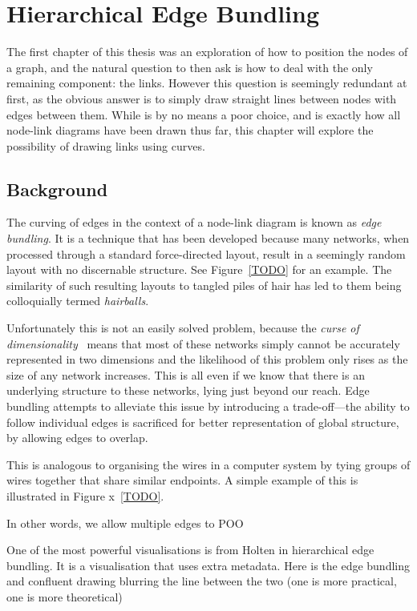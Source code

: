 \chapter{Hierarchical Edge Bundling}
The first chapter of this thesis was an exploration of how to position the nodes of a graph, and the natural question to then ask is how to deal with the only remaining component: the links. However this question is seemingly redundant at first, as the obvious answer is to simply draw straight lines between nodes with edges between them. While is by no means a poor choice, and is exactly how all node-link diagrams have been drawn thus far, this chapter will explore the possibility of drawing links using curves.

\section{Background}
The curving of edges in the context of a node-link diagram is known as \textit{edge bundling}. It is a technique that has been developed because many networks, when processed through a standard force-directed layout, result in a seemingly random layout with no discernable structure. See Figure~\ref{TODO} for an example. The similarity of such resulting layouts to tangled piles of hair has led to them being colloquially termed \textit{hairballs}. 

Unfortunately this is not an easily solved problem, because the \textit{curse of dimensionality}~\cite{TODO} means that most of these networks simply cannot be accurately represented in two dimensions and the likelihood of this problem only rises as the size of any network increases. This is all even if we know that there is an underlying structure to these networks, lying just beyond our reach.
Edge bundling attempts to alleviate this issue by introducing a trade-off---the ability to follow individual edges is sacrificed for better representation of global structure, by allowing edges to overlap. 

This is analogous to organising the wires in a computer system by tying groups of wires together that share similar endpoints. A simple example of this is illustrated in Figure x~\ref{TODO}.

In other words, we allow multiple edges to POO

One of the most powerful visualisations is from Holten in hierarchical edge bundling. It is a visualisation that uses extra metadata. Here is the 
edge bundling and confluent drawing
blurring the line between the two (one is more practical, one is more theoretical)

